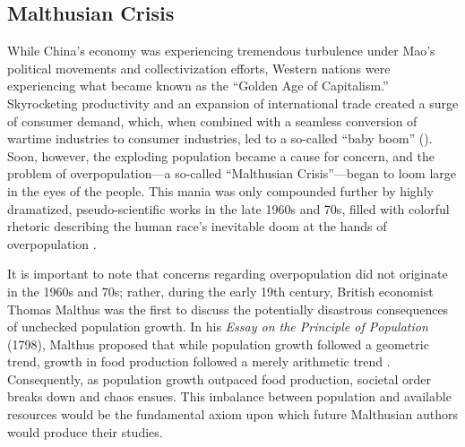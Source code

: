\subsection{Malthusian Crisis}

While China’s economy was experiencing tremendous turbulence under Mao’s political movements and collectivization efforts, Western nations were experiencing what became known as the “Golden Age of Capitalism.” Skyrocketing productivity and an expansion of international trade created a surge of consumer demand, which, when combined with a seamless conversion of wartime industries to consumer industries, led to a so-called “baby boom” (\cites{UN2017PostWarReconstruction}{Moffatt2020ThoughtCo}{Easterlin1987}). Soon, however, the exploding population became a cause for concern, and the problem of overpopulation---a so-called “Malthusian Crisis”---began to loom large in the eyes of the people. This mania was only compounded further by highly dramatized, pseudo-scientific works in the late 1960s and 70s, filled with colorful rhetoric describing the human race’s inevitable doom at the hands of overpopulation \autocite[p.\ 73]{DesrochersHoffbauer2009}.

It is important to note that concerns regarding overpopulation did not originate in the 1960s and 70s; rather, during the early 19th century, British economist Thomas Malthus was the first to discuss the potentially disastrous consequences of unchecked population growth. In his \emph{Essay on the Principle of Population} (1798), Malthus proposed that while population growth followed a geometric trend, growth in food production followed a merely arithmetic trend \autocite{Malthus1999}. Consequently, as population growth outpaced food production, societal order breaks down and chaos ensues. This imbalance between population and available resources would be the fundamental axiom upon which future Malthusian authors would produce their studies.

